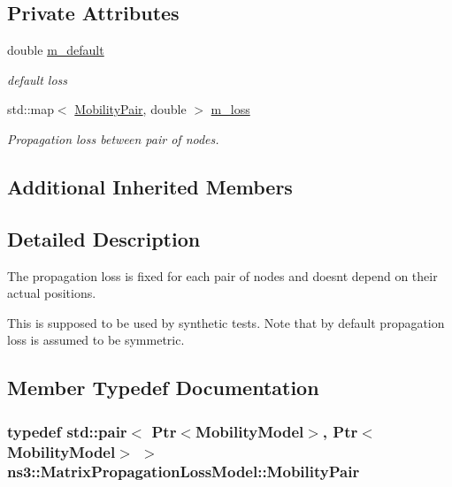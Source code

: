 \subsection*{Private Attributes}
\begin{DoxyCompactItemize}
\item 
double \hyperlink{classns3_1_1MatrixPropagationLossModel_aca9dd39c9cab68ac833fd1c1398bf1ff}{m\+\_\+default}
\begin{DoxyCompactList}\small\item\em default loss \end{DoxyCompactList}\item 
std\+::map$<$ \hyperlink{classns3_1_1MatrixPropagationLossModel_acbe65d220c793b458010f103df4641cf}{Mobility\+Pair}, double $>$ \hyperlink{classns3_1_1MatrixPropagationLossModel_af3e8cac671db25139cc6b5f5192bcad5}{m\+\_\+loss}
\begin{DoxyCompactList}\small\item\em Propagation loss between pair of nodes. \end{DoxyCompactList}\end{DoxyCompactItemize}
\subsection*{Additional Inherited Members}


\subsection{Detailed Description}
The propagation loss is fixed for each pair of nodes and doesn\textquotesingle{}t depend on their actual positions. 

This is supposed to be used by synthetic tests. Note that by default propagation loss is assumed to be symmetric. 

\subsection{Member Typedef Documentation}
\subsubsection[{\texorpdfstring{Mobility\+Pair}{MobilityPair}}]{\setlength{\rightskip}{0pt plus 5cm}typedef std\+::pair$<$ {\bf Ptr}$<${\bf Mobility\+Model}$>$, {\bf Ptr}$<${\bf Mobility\+Model}$>$ $>$ {\bf ns3\+::\+Matrix\+Propagation\+Loss\+Model\+::\+Mobility\+Pair}\hspace{0.3cm}{\ttfamily [private]}}\hypertarget{classns3_1_1MatrixPropagationLossModel_acbe65d220c793b458010f103df4641cf}{}\label{classns3_1_1MatrixPropagationLossModel_acbe65d220c793b458010f103df4641cf}


